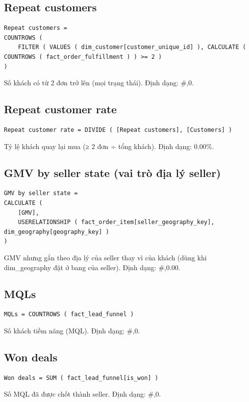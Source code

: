 \subsection*{Repeat customers}
\begin{lstlisting}[language={}]
Repeat customers =
COUNTROWS (
    FILTER ( VALUES ( dim_customer[customer_unique_id] ), CALCULATE ( COUNTROWS ( fact_order_fulfillment ) ) >= 2 )
)
\end{lstlisting}
Số khách có từ 2 đơn trở lên (mọi trạng thái). Định dạng: \#,0.

\subsection*{Repeat customer rate}
\begin{lstlisting}[language={}]
Repeat customer rate = DIVIDE ( [Repeat customers], [Customers] )
\end{lstlisting}
Tỷ lệ khách quay lại mua (≥ 2 đơn ÷ tổng khách). Định dạng: 0.00\%.

\subsection*{GMV by seller state (vai trò địa lý seller)}
\begin{lstlisting}[language={}]
GMV by seller state =
CALCULATE (
    [GMV],
    USERELATIONSHIP ( fact_order_item[seller_geography_key], dim_geography[geography_key] )
)
\end{lstlisting}
GMV nhưng gắn theo địa lý của seller thay vì của khách (dùng khi dim\_geography đặt ở bang của seller). Định dạng: \#,0.00.

\subsection*{MQLs}
\begin{lstlisting}[language={}]
MQLs = COUNTROWS ( fact_lead_funnel )
\end{lstlisting}
Số khách tiềm năng (MQL). Định dạng: \#,0.

\subsection*{Won deals}
\begin{lstlisting}[language={}]
Won deals = SUM ( fact_lead_funnel[is_won] )
\end{lstlisting}
Số MQL đã được chốt thành seller. Định dạng: \#,0.

